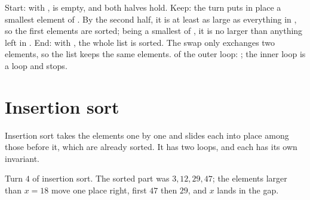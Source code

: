 Start: with ,  is empty, and both halves hold. Keep: the turn puts in place  a smallest
element of . By the second half, it is at least as large as everything in , so the
first  elements are sorted; being a smallest of , it is no larger than anything left in . End: with
, the whole list is sorted. The swap only exchanges two elements, so the list keeps the same elements.
 of the outer loop: ; the inner loop is a  loop and stops.

\section{Insertion sort}\label{sec:g11:proving-algorithms-correct:insertion}

Insertion sort takes the elements one by one and slides each into place among those before it, which are already
sorted. It has two loops, and each has its own invariant.

\label{lst:g11:proving-algorithms-correct:insertion}

\label{out:g11:proving-algorithms-correct:insertion}

\begin{omfigure}

{\small Turn $4$ of insertion sort. The sorted part was $3, 12, 29, 47$; the elements larger than $x = 18$ move one place
right, first $47$ then $29$, and $x$ lands in the gap.}
\end{omfigure}


